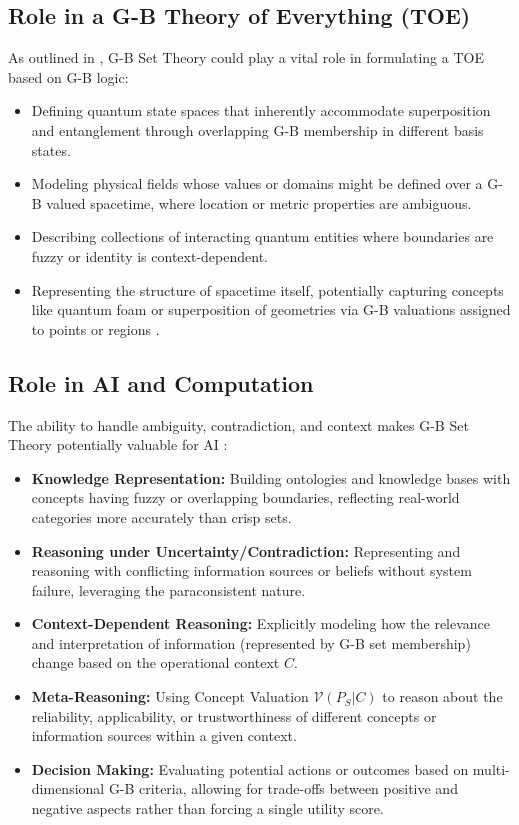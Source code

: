 \documentclass[11pt]{article}
\newcommand{\gbval}[1]{\mathcal{V}(#1)}         %
\newcommand{\pset}[1]{P_{#1}}                   %
\theoremstyle{definition}
\theoremstyle{plain}
\begin{document}
\subsection{Role in a G-B Theory of Everything (TOE)}
As outlined in \cite{gb_toe_outline}, G-B Set Theory could play a vital role in formulating a TOE based on G-B logic:
\begin{itemize}
    \item Defining quantum state spaces that inherently accommodate superposition and entanglement through overlapping G-B membership in different basis states.
    \item Modeling physical fields whose values or domains might be defined over a G-B valued spacetime, where location or metric properties are ambiguous.
    \item Describing collections of interacting quantum entities where boundaries are fuzzy or identity is context-dependent.
    \item Representing the structure of spacetime itself, potentially capturing concepts like quantum foam or superposition of geometries via G-B valuations assigned to points or regions \cite{gb_set_theory_outline}.
\end{itemize}

\subsection{Role in AI and Computation}
The ability to handle ambiguity, contradiction, and context makes G-B Set Theory potentially valuable for AI \cite{gb_set_theory_outline, gb_ai_outline}:
\begin{itemize}
    \item \textbf{Knowledge Representation:} Building ontologies and knowledge bases with concepts having fuzzy or overlapping boundaries, reflecting real-world categories more accurately than crisp sets.
    \item \textbf{Reasoning under Uncertainty/Contradiction:} Representing and reasoning with conflicting information sources or beliefs without system failure, leveraging the paraconsistent nature.
    \item \textbf{Context-Dependent Reasoning:} Explicitly modeling how the relevance and interpretation of information (represented by G-B set membership) change based on the operational context $C$.
    \item \textbf{Meta-Reasoning:} Using Concept Valuation $\gbval{\pset{S}|C}$ to reason about the reliability, applicability, or trustworthiness of different concepts or information sources within a given context.
    \item \textbf{Decision Making:} Evaluating potential actions or outcomes based on multi-dimensional G-B criteria, allowing for trade-offs between positive and negative aspects rather than forcing a single utility score.
\end{itemize}
\end{document}
